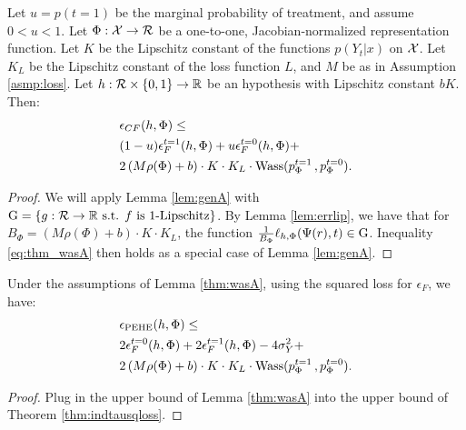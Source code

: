 \begin{thmapplem}\label{thm:wasA}
Let $u = p(t=1)$ be the marginal probability of treatment, and assume $0<u<1$. Let $\Phi : \mathcal X \rightarrow \mathcal{R}$ be a one-to-one, Jacobian-normalized representation function. Let $K$ be the Lipschitz constant of the functions $p(Y_t|x)$ on $\mathcal X$. Let $K_L$ be the Lipschitz constant of the loss function $L$, and $M$ be as in Assumption \ref{asmp:loss}. Let $h : \mathcal{R} \times \{0,1\} \rightarrow \mathbb{R}$ be an hypothesis with Lipschitz constant $b K$.
Then:
\begin{align}\label{eq:thm_wasA}
&\epsilon_{CF}(h,\Phi) \leq  \nonumber \\
&(1-u)  \epsilon^{t=1}_F(h,\Phi) + u  \epsilon^{t=0}_F(h,\Phi)  + \nonumber \\
& 2 \left(M \rho(\Phi) +b\right) \cdot K  \cdot K_L \cdot \text{Wass}(p^{t=1}_\Phi \, , p^{t=0}_\Phi).
\end{align}
\end{thmapplem}

\begin{proof}
We will apply Lemma \ref{lem:genA} with $\mathrm{G} = \{g: \mathcal{R} \rightarrow \mathbb{R} \text{ s.t. } f  \text{ is } 1 \text{-Lipschitz}\}$. By Lemma \ref{lem:errlip}, we have that for $B_\Phi = \left(M \rho(\Phi) +b\right) \cdot K  \cdot K_L$, the function $\frac{1}{B_\Phi} \ell_{h,\Phi}(\Psi(r),t) \in \mathrm{G}$. Inequality \eqref{eq:thm_wasA} then holds as a special case of Lemma \ref{lem:genA}.
\end{proof}
\begin{thmappthm}%
Under the assumptions of Lemma \ref{thm:wasA}, using the squared loss for $\epsilon_F$, we have:
\begin{align*}
&\epsilon_{\text{PEHE}}(h,\Phi) \leq \nonumber \\
&2 \epsilon^{t=0}_F(h,\Phi)  + 2\epsilon^{t=1}_F(h,\Phi)  - 4\sigma^2_Y +  \nonumber \\
&2 \left(M \rho(\Phi) +b\right) \cdot K  \cdot K_L \cdot \text{Wass}( p^{t=1}_\Phi \, ,  p^{t=0}_\Phi) .
\end{align*}
\end{thmappthm}
\begin{proof}
Plug in the upper bound of Lemma \ref{thm:wasA} into the upper bound of Theorem \ref{thm:indtausqloss}.
\end{proof}


